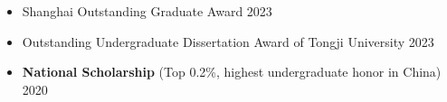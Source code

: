 \begin{rSection}



    \begin{itemize}
        \item \small {Shanghai Outstanding Graduate Award} \hfill 2023
            \vspace{-1mm}

        \item \small {Outstanding Undergraduate Dissertation Award of
            Tongji University} \hfill 2023
            \vspace{-1mm}

        \item \small \textbf{National Scholarship} (Top 0.2\%, highest undergraduate
            honor in China) \hfill 2020
            \vspace{-1mm}
    \end{itemize}
    \vspace{-0.5mm}
\end{rSection}